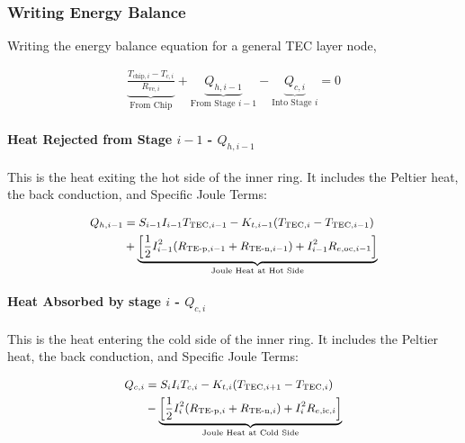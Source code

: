 \documentclass[10pt,a4paper,twocolumn]{article}
\begin{document}
\subsubsection{Writing Energy Balance}

Writing the energy balance equation for a general TEC layer node,

\begin{align}
  \underbrace{\frac{T_{\text{chip},i} - T_{c,i}}{R_{\text{ve},i}}}_{\text{From Chip}}+\underbrace{Q_{h, i-1}}_{\text{From Stage } i-1} - \underbrace{Q_{c, i}}_{\text{Into Stage } i} = 0
  \label{eq:TEC_layer_energy_balance}
\end{align}

\paragraph{Heat Rejected from Stage $i-1$ - $Q_{h, i-1}$} This is the heat exiting the hot side of the inner ring. It includes the Peltier heat, the back conduction, and Specific Joule Terms:

\begin{equation}
  \small
  \begin{aligned}
    Q_{h,i-1} & = S_{i-1} I_{i-1} T_{\text{TEC},i-1} - K_{t,i-1}(T_{\text{TEC},i} - T_{\text{TEC},i-1}) \\ &+ \underbrace{\left[ \frac{1}{2}I_{i-1}^2 (R_{\text{TE-p},i-1}+R_{\text{TE-n},i-1})+  I_{i-1}^2 R_{e,\text{oc},i-1} \right]}_{\text{Joule Heat at Hot Side}}
  \end{aligned}
  \label{eq:Q_h_i-1}
\end{equation}

\paragraph{Heat Absorbed by stage $i$ - $Q_{c, i}$} This is the heat entering the cold side of the inner ring. It includes the Peltier heat, the back conduction, and Specific Joule Terms:

\begin{equation}
  \small
  \begin{aligned}
    Q_{c,i} & = S_{i} I_{i} T_{c,i} - K_{t,i}(T_{\text{TEC},i+1} - T_{\text{TEC},i}) \\ &- \underbrace{\left[ \frac{1}{2}I_{i}^2 (R_{\text{TE-p},i}+R_{\text{TE-n},i}) +  I_{i}^2 R_{e,\text{ic},i} \right]}_{\text{Joule Heat at Cold Side}}
    \label{eq:Q_c_i}
  \end{aligned}
\end{equation}
\end{document}
